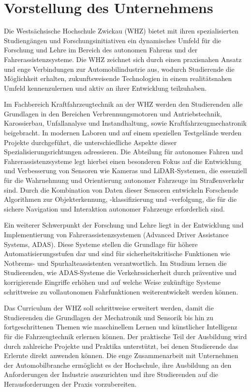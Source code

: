 \documentclass[ngerman]{article}    %
\theoremstyle{definition}
\begin{document}
\section{Vorstellung des Unternehmens}

Die Westsächsische Hochschule Zwickau (WHZ) bietet mit ihren spezialisierten Studiengängen und Forschungsinitiativen ein dynamisches Umfeld für die Forschung und Lehre im Bereich des autonomen Fahrens und der Fahrerassistenzsysteme. Die WHZ zeichnet sich durch einen praxisnahen Ansatz und enge Verbindungen zur Automobilindustrie aus, wodurch Studierende die Möglichkeit erhalten, zukunftsweisende Technologien in einem realitätsnahen Umfeld kennenzulernen und aktiv an ihrer Entwicklung teilzuhaben.

Im Fachbereich Kraftfahrzeugtechnik an der WHZ werden den Studierenden alle Grundlagen in den Bereichen Verbrennungsmotoren und Antriebstechnik, Karossierbau, Unfallanalyse und Instandhaltung, sowie Kraftfahrzeugmechatronik beigebracht. In modernen Laboren und auf einem speziellen Testgelände werden Projekte durchgeführt, die unterschiedliche Aspekte dieser Spezialisierungsrichtungen adressieren. Die Abteilung für autonomes Fahren und Fahrerassistenzsysteme legt hierbei einen besonderen Fokus auf die Entwicklung und Verbesserung von Sensoren wie Kameras und LiDAR-Systemen, die essenziell für die Wahrnehmung und Orientierung autonomer Fahrzeuge im Straßenverkehr sind. Durch die Kombination von Daten dieser Sensoren entwickeln Forschende Algorithmen zur Objekterkennung, -klassifizierung und -verfolgung, die für die sichere Navigation und Interaktion autonomer Fahrzeuge erforderlich sind.

Ein weiterer Schwerpunkt der Forschung und Lehre liegt in der Entwicklung und Implementierung von Fahrerassistenzsystemen (Advanced Driver Assistance Systems, ADAS). Diese Systeme stellen die Grundlage für höhere Automatisierungsstufen dar und sind für sicherheitskritische Funktionen wie Notbrems- und Spurhalteassistenten verantwortlich. Im Studium lernen die Studierenden, wie ADAS-Systeme die Verkehrssicherheit durch präventive und korrigierende Eingriffe erhöhen und auf welche Weise zukünftige Systeme schrittweise zu vollautonomen Fahrfunktionen weiterentwickelt werden können.

Das Curriculum der WHZ soll schrittweise erweitert werden, damit die Studierenden die Grundlagen der Mechatronik und Sensorik bis hin zu fortgeschrittenen Themen wie maschinellem Lernen und künstlicher Intelligenz für die Fahrzeugtechnik erlernen können. Der praktische Teil der Ausbildung wird durch zahlreiche Projekte und Praktika unterstützt, bei denen Studierende das Erlernte direkt anwenden können. Die enge Zusammenarbeit mit Unternehmen der Automobilbranche ermöglicht es der Hochschule, ihre Ausbildung an den Anforderungen der Industrie auszurichten und ihre Studierenden auf die Herausforderungen der Praxis vorzubereiten.
\end{document}
